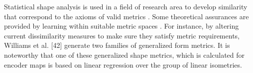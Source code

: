 


Statistical shape analysis \cite{small_statistical_2012} is used in a field of research area to develop similarity that correspond to the axioms of valid metrics \cite{boix_gulp_nodate, shahbazi_riemann_manif, williams_generalized_2021}. 
Some theoretical assurances are provided by learning within suitable metric spaces \cite{baraty_impact_2011, chang_clust_met_space, dasgupta_performance_2005, wang_survey_dist_metr, williams_generalized_2021}. 
For instance, by altering current dissimilarity measures to make sure they satisfy metric requirements, Williams et al. [42] generate two families of generalized form metrics. 
It is noteworthy that one of these generalized shape metrics, which is calculated for encoder maps is based on linear regression over the group of linear isometries.